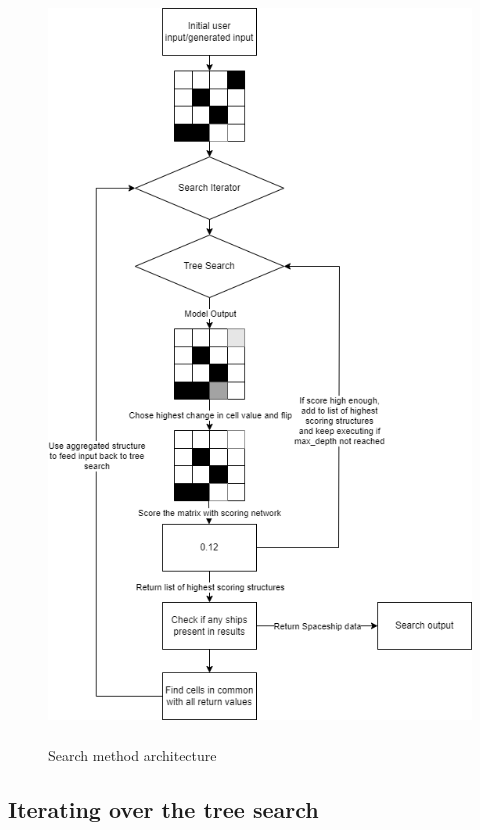 \documentclass{l4proj}
\begin{document}
\begin{figure}[h]
\includegraphics[width=0.9\linewidth, height=20cm]{dissertation/images/diagrams/gol_search_structure.png}
\caption{Search method architecture}
\label{fig:subim1}
\end{figure}

\subsection{Iterating over the tree search}
\end{document}
